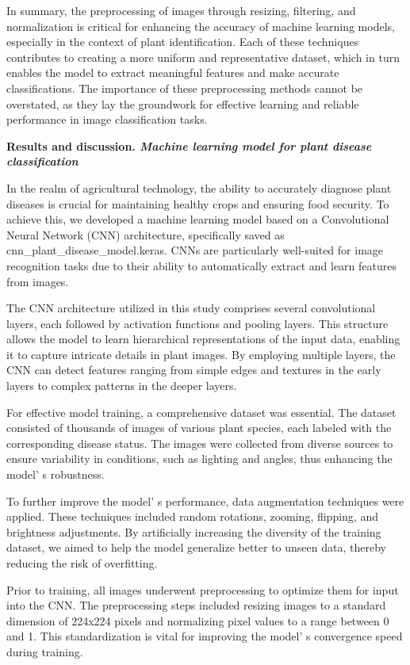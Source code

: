 \begin{multicols}{2}
In summary, the preprocessing of images through resizing, filtering, and
normalization is critical for enhancing the accuracy of machine learning
models, especially in the context of plant identification. Each of these
techniques contributes to creating a more uniform and representative
dataset, which in turn enables the model to extract meaningful features
and make accurate classifications. The importance of these preprocessing
methods cannot be overstated, as they lay the groundwork for effective
learning and reliable performance in image classification tasks.

{\bfseries Results and discussion. \emph{Machine learning model for plant
disease classification}}

In the realm of agricultural technology, the ability to accurately
diagnose plant diseases is crucial for maintaining healthy crops and
ensuring food security. To achieve this, we developed a machine learning
model based on a Convolutional Neural Network (CNN) architecture,
specifically saved as cnn\_plant\_disease\_model.keras. CNNs are
particularly well-suited for image recognition tasks due to their
ability to automatically extract and learn features from images.

The CNN architecture utilized in this study comprises several
convolutional layers, each followed by activation functions and pooling
layers. This structure allows the model to learn hierarchical
representations of the input data, enabling it to capture intricate
details in plant images. By employing multiple layers, the CNN can
detect features ranging from simple edges and textures in the early
layers to complex patterns in the deeper layers.

For effective model training, a comprehensive dataset was essential. The
dataset consisted of thousands of images of various plant species, each
labeled with the corresponding disease status. The images were collected
from diverse sources to ensure variability in conditions, such as
lighting and angles, thus enhancing the model' s
robustness.

To further improve the model' s performance, data
augmentation techniques were applied. These techniques included random
rotations, zooming, flipping, and brightness adjustments. By
artificially increasing the diversity of the training dataset, we aimed
to help the model generalize better to unseen data, thereby reducing the
risk of overfitting.

Prior to training, all images underwent preprocessing to optimize them
for input into the CNN. The preprocessing steps included resizing images
to a standard dimension of 224x224 pixels and normalizing pixel values
to a range between 0 and 1. This standardization is vital for improving
the model' s convergence speed during training.


\end{multicols}
